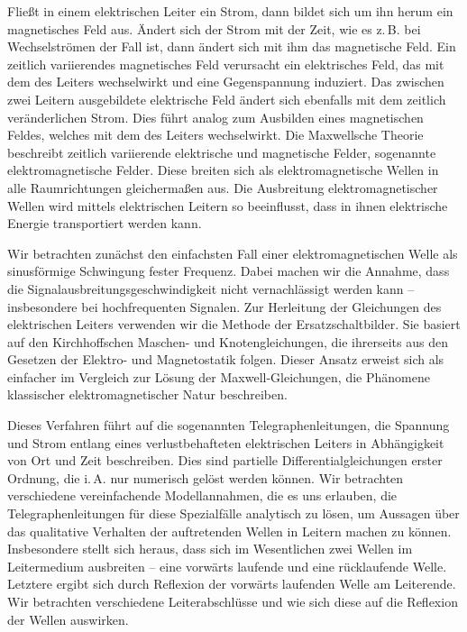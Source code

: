 \documentclass[paper=a4, parskip=half-, ngerman, fontsize=11pt]{scrreprt}
\begin{document}
Fließt in einem elektrischen Leiter ein Strom, dann bildet sich um ihn herum ein magnetisches Feld aus. Ändert sich der
Strom mit der Zeit, wie es z.\,B. bei Wechselströmen der Fall ist, dann ändert sich mit ihm das magnetische Feld. Ein
zeitlich variierendes magnetisches Feld verursacht ein elektrisches Feld, das mit dem des Leiters wechselwirkt und
eine  Gegenspannung induziert. Das zwischen zwei Leitern ausgebildete elektrische Feld ändert sich ebenfalls mit dem
zeitlich veränderlichen Strom. Dies führt analog zum Ausbilden eines magnetischen Feldes, welches mit dem des Leiters
wechselwirkt. Die Maxwellsche Theorie beschreibt zeitlich variierende elektrische und magnetische Felder, sogenannte
elektromagnetische Felder. Diese breiten sich als elektromagnetische Wellen in alle Raumrichtungen gleichermaßen aus.
Die Ausbreitung elektromagnetischer Wellen wird mittels elektrischen Leitern so beeinflusst, dass in ihnen elektrische
Energie transportiert werden kann.

Wir betrachten zunächst den einfachsten Fall einer elektromagnetischen Welle als sinusförmige Schwingung fester
Frequenz. Dabei machen wir die Annahme, dass die Signalausbreitungsgeschwindigkeit nicht vernachlässigt werden kann --
insbesondere bei hochfrequenten Signalen. Zur Herleitung der Gleichungen des elektrischen Leiters
verwenden wir die Methode der Ersatzschaltbilder. Sie basiert auf den Kirchhoffschen Maschen- und Knotengleichungen,
die ihrerseits aus den Gesetzen der Elektro- und Magnetostatik folgen. Dieser Ansatz erweist sich als einfacher
im Vergleich zur Lösung der Maxwell-Gleichungen, die Phänomene klassischer elektromagnetischer Natur beschreiben.

Dieses Verfahren führt auf die sogenannten Telegraphenleitungen, die Spannung und Strom entlang eines verlustbehafteten
elektrischen Leiters in Abhängigkeit von Ort und Zeit beschreiben. Dies sind partielle Differentialgleichungen erster
Ordnung, die i.\,A. nur numerisch gelöst werden können. Wir betrachten verschiedene vereinfachende Modellannahmen, die
es uns erlauben, die Telegraphenleitungen für diese Spezialfälle analytisch zu lösen, um Aussagen über das qualitative
Verhalten der auftretenden Wellen in Leitern machen zu können. Insbesondere stellt sich heraus, dass sich im
Wesentlichen zwei Wellen im Leitermedium ausbreiten -- eine vorwärts laufende und eine rücklaufende Welle. Letztere
ergibt sich durch Reflexion der vorwärts laufenden Welle am Leiterende. Wir betrachten verschiedene Leiterabschlüsse
und wie sich diese auf die Reflexion der Wellen auswirken.
\end{document}
